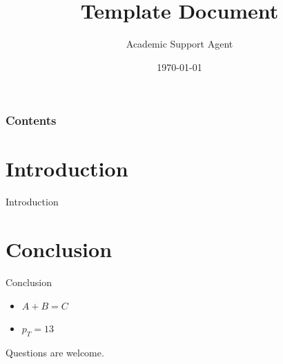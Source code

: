\documentclass{article}
\title{Template Document}
\author{Academic Support Agent}
\date{\today}
\begin{document}
\maketitle

\begin{frame}[plain,t]
\titlepage
\end{frame}

\begin{frame}
\frametitle{Contents}

\end{frame}
\section{Introduction}
    \begin{frame}{Introduction}
    \end{frame}


\section{Conclusion}

    \begin{frame}{Conclusion}
    
    \begin{itemize}
        \item $A+B=C$
        \item $p_T=13$
    \end{itemize}
    \end{frame}

\begin{frame}
\centering
\Huge
Questions are welcome.
\end{frame}
\end{document}
